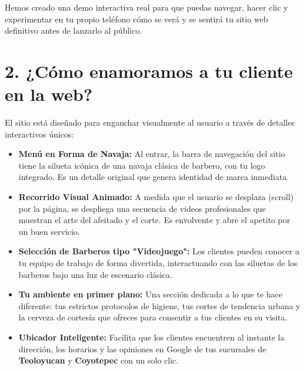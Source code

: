 \documentclass[11pt,a4paper]{article}
\begin{document}
\begin{tarjeta}
    Hemos creado una demo interactiva real para que puedas navegar, hacer clic y experimentar en tu propio teléfono cómo se verá y se sentirá tu sitio web definitivo antes de lanzarlo al público.
\end{tarjeta}

\vspace*{0.3cm}

\section{2. ¿Cómo enamoramos a tu cliente en la web?}
El sitio está diseñado para enganchar visualmente al usuario a través de detalles interactivos únicos:

\begin{itemize}[label=\color{accentblue}\tiny$\blacksquare$]
    \item \textbf{Menú en Forma de Navaja:} Al entrar, la barra de navegación del sitio tiene la silueta icónica de una navaja clásica de barbero, con tu logo integrado. Es un detalle original que genera identidad de marca inmediata.

    \item \textbf{Recorrido Visual Animado:} A medida que el usuario se desplaza (scroll) por la página, se despliega una secuencia de videos profesionales que muestran el arte del afeitado y el corte. Es envolvente y abre el apetito por un buen servicio.

    \item \textbf{Selección de Barberos tipo "Videojuego":} Los clientes pueden conocer a tu equipo de trabajo de forma divertida, interactuando con las siluetas de los barberos bajo una luz de escenario clásica.

    \item \textbf{Tu ambiente en primer plano:} Una sección dedicada a lo que te hace diferente: tus estrictos protocolos de higiene, tus cortes de tendencia urbana y la cerveza de cortesía que ofreces para consentir a tus clientes en su visita.

    \item \textbf{Ubicador Inteligente:} Facilita que los clientes encuentren al instante la dirección, los horarios y las opiniones en Google de tus sucursales de \textbf{Teoloyucan} y \textbf{Coyotepec} con un solo clic.
\end{itemize}
\end{document}
